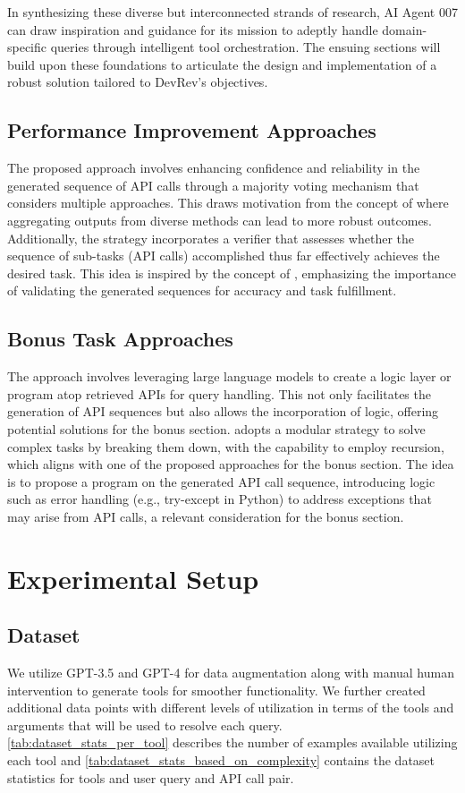 \documentclass[10pt,twocolumn,letterpaper]{article}
\begin{document}
In synthesizing these diverse but interconnected strands of research, AI Agent 007 can draw inspiration and guidance for its mission to adeptly handle domain-specific queries through intelligent tool orchestration. The ensuing sections will build upon these foundations to articulate the design and implementation of a robust solution tailored to DevRev's objectives.

\subsection{Performance Improvement Approaches}
The proposed approach involves enhancing confidence and reliability in the generated sequence of API calls through a majority voting mechanism that considers multiple approaches. This draws motivation from the concept of \cite{imani2023mathprompter} where aggregating outputs from diverse methods can lead to more robust outcomes. Additionally, the strategy incorporates a verifier that assesses whether the sequence of sub-tasks (API calls) accomplished thus far effectively achieves the desired task. This idea is inspired by the concept of \cite{cobbe2021training}, emphasizing the importance of validating the generated sequences for accuracy and task fulfillment.
\subsection{Bonus Task Approaches}
The \cite{cai2023large} approach involves leveraging large language models to create a logic layer or program atop retrieved APIs for query handling. This not only facilitates the generation of API sequences but also allows the incorporation of logic, offering potential solutions for the bonus section. \cite{khot2023decomposed} adopts a modular strategy to solve complex tasks by breaking them down, with the capability to employ recursion, which aligns with one of the proposed approaches for the bonus section. The idea is to propose a program on the generated API call sequence, introducing logic such as error handling (e.g., try-except in Python) to address exceptions that may arise from API calls, a relevant consideration for the bonus section.
\section{Experimental Setup}
\subsection{Dataset}
We utilize GPT-3.5 and GPT-4 for data augmentation along with manual human intervention to generate tools for smoother functionality. We further created additional data points with different levels of utilization in terms of the tools and arguments that will be used to resolve each query.\\ \autoref{tab:dataset_stats_per_tool} describes the number of examples available utilizing each tool and \autoref{tab:dataset_stats_based_on_complexity} contains the dataset statistics for tools and user query and API call pair.
\end{document}
